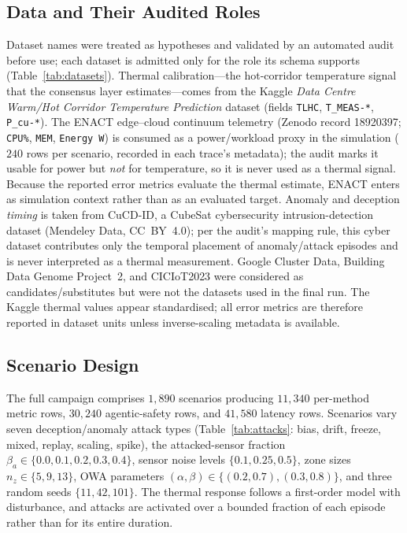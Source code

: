 \documentclass[preprint,11pt]{elsarticle}
\begin{document}
\subsection{Data and Their Audited Roles}
\label{sec:setup_data}

Dataset names were treated as hypotheses and validated by an automated
audit before use; each dataset is admitted only for the role its schema
supports (Table~\ref{tab:datasets}). Thermal calibration---the
hot-corridor temperature signal that the consensus layer
estimates---comes from the Kaggle \emph{Data Centre Warm/Hot Corridor
Temperature Prediction} dataset (fields \texttt{TLHC},
\texttt{T\_MEAS-*}, \texttt{P\_cu-*}). The ENACT edge--cloud continuum
telemetry (Zenodo record 18920397; \texttt{CPU\%}, \texttt{MEM},
\texttt{Energy\,W}) is consumed as a power/workload proxy in the
simulation ($240$ rows per scenario, recorded in each trace's metadata);
the audit marks it usable for power but \emph{not} for temperature, so it
is never used as a thermal signal. Because the reported error metrics
evaluate the thermal estimate, ENACT enters as simulation context rather
than as an evaluated target. Anomaly and deception \emph{timing} is
taken from CuCD-ID, a CubeSat cybersecurity intrusion-detection dataset
(Mendeley Data, CC~BY~4.0); per the audit's mapping rule, this
cyber dataset contributes only the temporal placement of
anomaly/attack episodes and is never interpreted as a thermal
measurement. Google Cluster Data, Building Data Genome Project~2, and
CICIoT2023 were considered as candidates/substitutes but were not the
datasets used in the final run. The Kaggle thermal values appear
standardised; all error metrics are therefore reported in dataset units
unless inverse-scaling metadata is available.



\subsection{Scenario Design}
\label{sec:setup_scenarios}

The full campaign comprises $1{,}890$ scenarios producing $11{,}340$
per-method metric rows, $30{,}240$ agentic-safety rows, and $41{,}580$
latency rows. Scenarios vary seven deception/anomaly attack types
(Table~\ref{tab:attacks}: bias, drift, freeze, mixed, replay, scaling,
spike), the attacked-sensor fraction $\beta_a\in\{0.0,0.1,0.2,0.3,0.4\}$,
sensor noise levels $\{0.1,0.25,0.5\}$, zone sizes
$n_z\in\{5,9,13\}$, OWA parameters $(\alpha,\beta)\in\{(0.2,0.7),(0.3,0.8)\}$,
and three random seeds $\{11,42,101\}$. The thermal response follows a
first-order model with disturbance, and attacks are activated over a
bounded fraction of each episode rather than for its entire duration.
\end{document}
